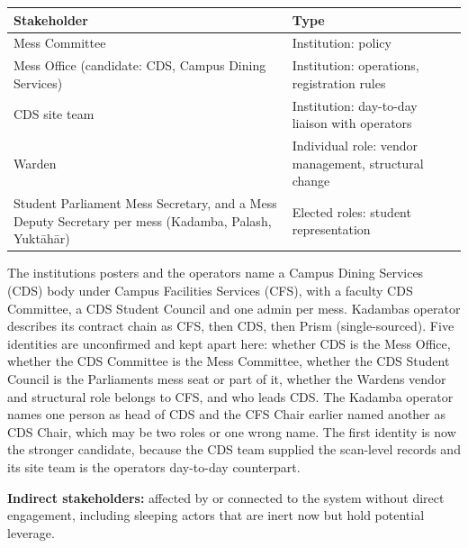 \documentclass[
  10pt,
  table]{article}
\newcounter{none} %
\begin{document}
{\def\LTcaptype{none} %
\begin{longtable}[]{@{}
  >{\raggedright\arraybackslash}p{}
  >{\raggedright\arraybackslash}p{}@{}}
\toprule\noalign{}
\begin{minipage}[b]{\linewidth}\raggedright
\cellcolor{pblue}\color{white}\bfseries Stakeholder
\end{minipage} & \begin{minipage}[b]{\linewidth}\raggedright
\cellcolor{pblue}\color{white}\bfseries Type
\end{minipage} \\
\midrule\noalign{}
\endhead
\bottomrule\noalign{}
\endlastfoot
Mess Committee & Institution: policy \\
Mess Office (candidate: CDS, Campus Dining Services) & Institution: operations, registration rules \\
CDS site team & Institution: day-to-day liaison with operators \\
Warden & Individual role: vendor management, structural change \\
Student Parliament Mess Secretary, and a Mess Deputy Secretary per mess (Kadamba, Palash, Yuktāhār) & Elected roles: student representation \\
\end{longtable}
}

The institution\textquotesingle s posters and the operators name a Campus Dining Services (CDS) body under Campus Facilities Services (CFS), with a faculty CDS Committee, a CDS Student Council and one admin per mess. Kadamba\textquotesingle s operator describes its contract chain as CFS, then CDS, then Prism (single-sourced). Five identities are unconfirmed and kept apart here: whether CDS is the Mess Office, whether the CDS Committee is the Mess Committee, whether the CDS Student Council is the Parliament\textquotesingle s mess seat or part of it, whether the Warden\textquotesingle s vendor and structural role belongs to CFS, and who leads CDS. The Kadamba operator names one person as head of CDS and the CFS Chair earlier named another as CDS Chair, which may be two roles or one wrong name. The first identity is now the stronger candidate, because the CDS team supplied the scan-level records and its site team is the operators\textquotesingle{} day-to-day counterpart.

\textbf{Indirect stakeholders:} affected by or connected to the system without direct engagement, including sleeping actors that are inert now but hold potential leverage.
\end{document}
